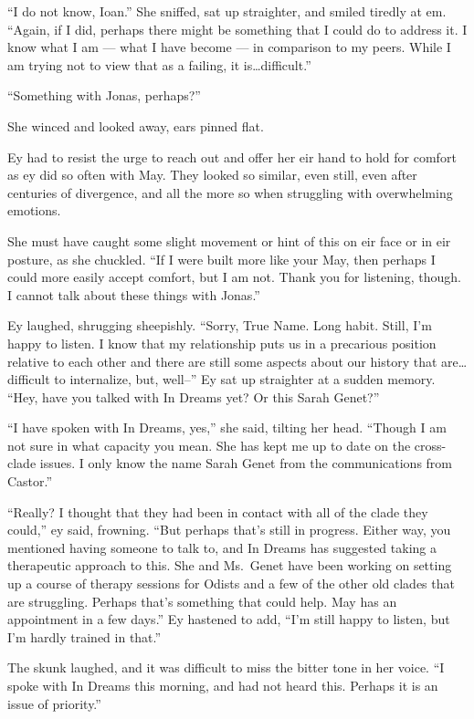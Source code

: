 ``I do not know, Ioan.'' She sniffed, sat up straighter, and smiled tiredly at em. ``Again, if I did, perhaps there might be something that I could do to address it. I know what I am — what I have become — in comparison to my peers. While I am trying not to view that as a failing, it is\ldots difficult.''

``Something with Jonas, perhaps?''

She winced and looked away, ears pinned flat.

Ey had to resist the urge to reach out and offer her eir hand to hold for comfort as ey did so often with May. They looked so similar, even still, even after centuries of divergence, and all the more so when struggling with overwhelming emotions.

She must have caught some slight movement or hint of this on eir face or in eir posture, as she chuckled. ``If I were built more like your May, then perhaps I could more easily accept comfort, but I am not. Thank you for listening, though. I cannot talk about these things with Jonas.''

Ey laughed, shrugging sheepishly. ``Sorry, True Name. Long habit. Still, I'm happy to listen. I know that my relationship puts us in a precarious position relative to each other and there are still some aspects about our history that are\ldots difficult to internalize, but, well--'' Ey sat up straighter at a sudden memory. ``Hey, have you talked with In Dreams yet? Or this Sarah Genet?''

``I have spoken with In Dreams, yes,'' she said, tilting her head. ``Though I am not sure in what capacity you mean. She has kept me up to date on the cross-clade issues. I only know the name Sarah Genet from the communications from Castor.''

``Really? I thought that they had been in contact with all of the clade they could,'' ey said, frowning. ``But perhaps that's still in progress. Either way, you mentioned having someone to talk to, and In Dreams has suggested taking a therapeutic approach to this. She and Ms.~Genet have been working on setting up a course of therapy sessions for Odists and a few of the other old clades that are struggling. Perhaps that's something that could help. May has an appointment in a few days.'' Ey hastened to add, ``I'm still happy to listen, but I'm hardly trained in that.''

The skunk laughed, and it was difficult to miss the bitter tone in her voice. ``I spoke with In Dreams this morning, and had not heard this. Perhaps it is an issue of priority.''

